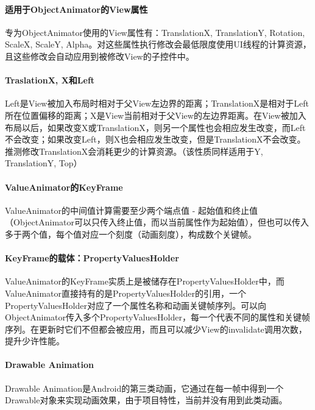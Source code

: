 \documentclass[UTF8]{ctexart}
\begin{document}
    \paragraph{适用于ObjectAnimator的View属性}
    专为ObjectAnimator使用的View属性有：TranslationX, TranslationY, Rotation, ScaleX, ScaleY, Alpha。对这些属性执行修改会最低限度使用UI线程的计算资源，且这些修改会自动应用到被修改View的子控件中。
    \paragraph{TraslationX, X和Left}
    Left是View被加入布局时相对于父View左边界的距离；TranslationX是相对于Left所在位置偏移的距离；X是View当前相对于父View的左边界距离。在View被加入布局以后，如果改变X或TranslationX，则另一个属性也会相应发生改变，而Left不会改变；如果改变Left，则X也会相应发生改变，但是TranslationX不会改变。推测修改TranslationX会消耗更少的计算资源。（该性质同样适用于Y, TranslationY, Top）
    \paragraph{ValueAnimator的KeyFrame}
    ValueAnimator的中间值计算需要至少两个端点值 - 起始值和终止值（ObjectAnimator可以只传入终止值，而以当前属性作为起始值），但也可以传入多于两个值，每个值对应一个刻度（动画刻度），构成数个关键帧。
    \paragraph{KeyFrame的载体：PropertyValuesHolder}
    ValueAnimator的KeyFrame实质上是被储存在PropertyValuesHolder中，而ValueAnimator直接持有的是PropertyValuesHolder的引用，一个PropertyValuesHolder对应了一个属性名称和动画关键帧序列。可以向ObjectAnimator传入多个PropertyValuesHolder，每一个代表不同的属性和关键帧序列。在更新时它们不但都会被应用，而且可以减少View的invalidate调用次数，提升少许性能。
    \paragraph{Drawable Animation}
    Drawable Animation是Android的第三类动画，它通过在每一帧中得到一个Drawable对象来实现动画效果，由于项目特性，当前并没有用到此类动画。
\end{document}
